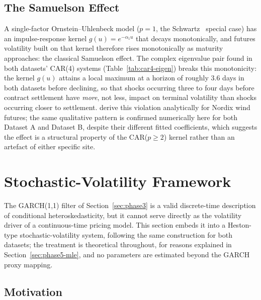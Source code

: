 \subsection{The Samuelson Effect}
\label{sec:phase4-samuelson}

A single-factor Ornstein--Uhlenbeck model ($p=1$, the Schwartz~\citeyearpar{Schwartz1997} special case) has an impulse-response kernel $g(u) = e^{-\alpha_1 u}$ that decays monotonically, and futures volatility built on that kernel therefore rises monotonically as maturity approaches: the classical Samuelson effect. The complex eigenvalue pair found in both datasets' CAR(4) systems (Table~\ref{tab:car4-eigen}) breaks this monotonicity: the kernel $g(u)$ attains a local maximum at a horizon of roughly 3.6 days in both datasets before declining, so that shocks occurring three to four days before contract settlement have \emph{more}, not less, impact on terminal volatility than shocks occurring closer to settlement. \citet{BenthSaltyteBenth2009} derive this violation analytically for Nordix wind futures; the same qualitative pattern is confirmed numerically here for both Dataset A and Dataset B, despite their different fitted coefficients, which suggests the effect is a structural property of the CAR($p\geq2$) kernel rather than an artefact of either specific site.

\section{Stochastic-Volatility Framework}
\label{sec:phase5}

The GARCH(1,1) filter of Section~\ref{sec:phase3} is a valid discrete-time description of conditional heteroskedasticity, but it cannot serve directly as the volatility driver of a continuous-time pricing model. This section embeds it into a Heston-type \citep{Heston1993} stochastic-volatility system, following the same construction for both datasets; the treatment is theoretical throughout, for reasons explained in Section~\ref{sec:phase5-mle}, and no parameters are estimated beyond the GARCH proxy mapping.

\subsection{Motivation}
\label{sec:phase5-motivation}

